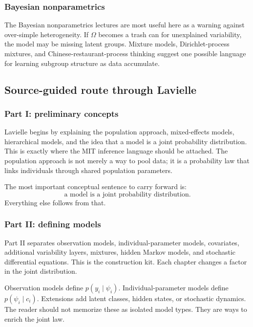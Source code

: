 \subsubsection*{Bayesian nonparametrics}

The Bayesian nonparametrics lectures are most useful here as a warning against over-simple heterogeneity.  If \(\Omega\) becomes a trash can for unexplained variability, the model may be missing latent groups.  Mixture models, Dirichlet-process mixtures, and Chinese-restaurant-process thinking suggest one possible language for learning subgroup structure as data accumulate.

\subsection{Source-guided route through Lavielle}

\subsubsection*{Part I: preliminary concepts}

Lavielle begins by explaining the population approach, mixed-effects models, hierarchical models, and the idea that a model is a joint probability distribution.  This is exactly where the MIT inference language should be attached.  The population approach is not merely a way to pool data; it is a probability law that links individuals through shared population parameters.

The most important conceptual sentence to carry forward is:
\[
  \text{a model is a joint probability distribution.}
\]
Everything else follows from that.

\subsubsection*{Part II: defining models}

Part II separates observation models, individual-parameter models, covariates, additional variability layers, mixtures, hidden Markov models, and stochastic differential equations.  This is the construction kit.  Each chapter changes a factor in the joint distribution.

Observation models define \(p(y_i\mid\psi_i)\).  Individual-parameter models define \(p(\psi_i\mid c_i)\).  Extensions add latent classes, hidden states, or stochastic dynamics.  The reader should not memorize these as isolated model types.  They are ways to enrich the joint law.

